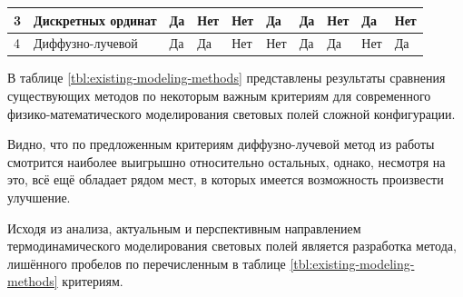 \begin{FixLineStretch}
\begin{table}
\begin{tabular}{|p{\wA}|p{\wB}|p{\wC}|p{\wD}|p{\wE}|p{\wF}|p{\wG}|p{\wH}|p{\wI}|p{\wJ}|}
		3                    & \everypar{\hspace*{0pt}} Дискретных ординат \cite{surzhikov}                                            & Да                                                           & Нет                                                                             & Нет                                                                               & Да                                                       & Да                                                                                             & Нет                                                                                                        & Да                                                           & Нет                                      \\ \hline
		4                    & \everypar{\hspace*{0pt}} Диффузно-лучевой \cite{gradov-dissertation}                                   & Да                                                           & Да                                                                              & Нет                                                                               & Нет                                                      & Да                                                                                             & Да                                                                                                         & Нет                                                          & Да                                       \\ \hline
	\end{tabular}
\end{table}
\end{FixLineStretch}
\let\wJ\relax
\let\wI\relax
\let\wH\relax
\let\wG\relax
\let\wF\relax
\let\wE\relax
\let\wD\relax
\let\wC\relax
\let\wB\relax
\let\wA\relax

В таблице \ref{tbl:existing-modeling-methods} представлены результаты сравнения существующих методов по некоторым важным критериям для современного физико-математического моделирования световых полей сложной конфигурации.

Видно, что по предложенным критериям диффузно-лучевой метод из работы \cite{gradov-dissertation} смотрится наиболее выигрышно относительно остальных, однако, несмотря на это, всё ещё обладает рядом мест, в которых имеется возможность произвести улучшение.

Исходя из анализа, актуальным и перспективным направлением термодинамического моделирования световых полей является разработка метода, лишённого пробелов по перечисленным в таблице \ref{tbl:existing-modeling-methods} критериям.

